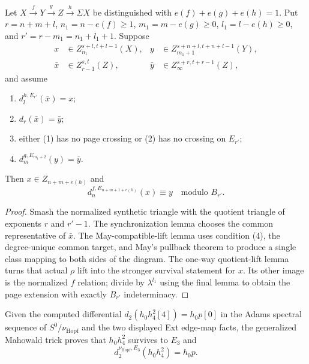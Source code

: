 \begin{theorem}
  \label{thm:generalized-mahowald}
  \notready
  Let
  $X\xrightarrow fY\xrightarrow gZ\xrightarrow h\Sigma X$ be distinguished
  with $e(f)+e(g)+e(h)=1$.  Put
  $r=n+m+l$, $n_1=n-e(f)\ge1$,
  $m_1=m-e(g)\ge0$, $l_1=l-e(h)\ge0$, and
  $r'=r-m_1=n_1+l_1+1$.  Suppose
  \[
  \begin{aligned}
    x&\in Z_{n_1}^{s+l,t+l-1}(X),&
    y&\in Z_{m_1+1}^{s+n+l,t+n+l-1}(Y),\\
    \bar x&\in Z_{r-1}^{s,t}(Z),&
    \bar y&\in Z_\infty^{s+r,t+r-1}(Z),
  \end{aligned}
  \]
  and assume
  \begin{enumerate}
    \item $d_l^{h,E_{r'}}(\bar x)=x$;
    \item $d_r(\bar x)=\bar y$;
    \item either (1) has no page crossing or (2) has no crossing on $E_{r'}$;
    \item $d_m^{g,E_{m_1+2}}(y)=\bar y$.
  \end{enumerate}
  Then $x\in Z_{n+m+e(h)}$ and
  \[
    d_n^{f,E_{n+m+1+e(h)}}(x)
       \equiv y\quad\text{modulo }B_{r'}.
  \]
\end{theorem}

\begin{proof}
  Smash the normalized synthetic triangle with the quotient triangle of
  exponents $r$ and $r'-1$.  The synchronization lemma chooses the common
  representative of $\bar x$.  The May-compatible-lift lemma uses condition
  (4), the degree-unique common target, and May's pullback theorem to produce a
  single class mapping to both sides of the diagram.  The one-way
  quotient-lift lemma turns that actual $\rho$ lift into the stronger survival
  statement for $x$.  Its other image is the normalized $f$ relation; divide
  by $\lambda^{l_1}$ using the final lemma to obtain the page extension with
  exactly $B_{r'}$ indeterminacy.
\end{proof}

\begin{proposition}
  \label{prop:mahowald-cofiber-regression}
  \notready
  Given the computed differential
  $d_2(h_0h_4^2[4])=h_0p[0]$ in the Adams spectral sequence of
  $S^0/\nu_{\mathrm{Hopf}}$ and the two displayed Ext edge-map facts, the
  generalized Mahowald trick proves that $h_0h_4^2$ survives to $E_3$ and
  \[
    d_2^{\nu_{\mathrm{Hopf}},E_3}(h_0h_4^2)=h_0p.
  \]
\end{proposition}

